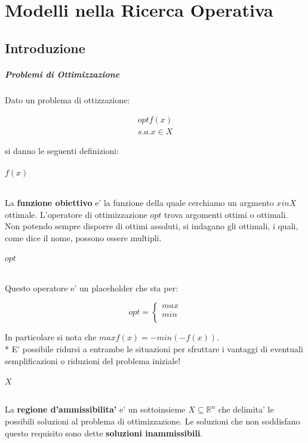 \newcommand{\N}{\mathbb{N}}
\newcommand{\Z}{\mathbb{Z}}
\newcommand{\R}{\mathbb{R}}

\chapter{Modelli nella Ricerca Operativa}

\section{Introduzione}

\paragraph{Problemi di Ottimizzazione}

Dato un problema di ottizzazione:

\begin{align*}
    \text{$opt f(x)$} \\
    \text{$s.a. x \in X$}
\end{align*}

si danno le seguenti definizioni:

\subparagraph{$f(x)$}

La \textbf{funzione obiettivo} e' la funzione della quale cerchiamo un argmento $x in X$ ottimale.
L'operatore di ottimizzazione $opt$ trova argomenti ottimi o ottimali.
Non potendo sempre disporre di ottimi assoluti, si indagano gli ottimali, i quali, come dice il nome, possono essere multipli.

\subparagraph{$opt$}

Questo operatore e' un placeholder che sta per:

\[
    opt =
    \begin{cases}
        \text {$max$} \\
        \text {$min$} \\
    \end{cases}
\]

In particolare si nota che $max f(x) = - min (- f(x))$. \\*
E' possibile ridursi a entrambe le situazioni per sfruttare i vantaggi di eventuali semplificazioni o riduzioni del problema iniziale!

\subparagraph{$X$}

La \textbf{regione d'ammissibilita'} e' un sottoinsieme $X \subseteq \R^n$ che delimita' le possibili soluzioni al problema di ottimizzazione.
Le soluzioni che non soddisfano questo requisito sono dette \textbf{soluzioni inammissibili}.

